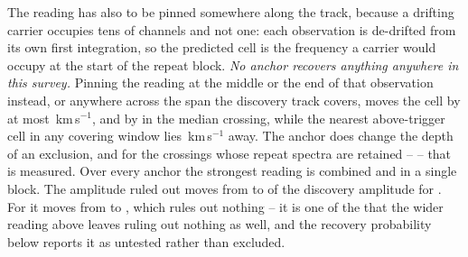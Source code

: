 The reading has also to be pinned somewhere along the track, because a
drifting carrier occupies tens of channels and not one: each observation is
de-drifted from its own first integration, so the predicted cell is the
frequency a carrier would occupy at the start of the repeat block. \emph{No anchor recovers anything anywhere in this survey.} Pinning the
reading at the middle or the end of that observation instead, or anywhere
across the span the discovery track covers, moves the cell by at most
\AnSpanMaxKms\,km\,s$^{-1}$, and by \AnSpanMedKms{} in the median crossing,
while the nearest above-trigger cell in any covering window lies
\AnNearKms\,km\,s$^{-1}$ away. The anchor does change the depth of an
exclusion, and for the \AnNMeas{} crossings whose repeat spectra are retained
-- \AnMeasStars{} -- that is measured. Over every anchor the strongest
reading is \AnTBest{} combined and \AnTSingle{} in a single block. The amplitude ruled out moves from \AnOtherFrom{} to \AnOtherTo{} of the
discovery amplitude for \AnOtherStar. For \AnWorstStar{} it moves from
\AnFracFrom{} to \AnFracTo, which rules out nothing -- it is one of the
\AnNWideVac{} that the wider reading above leaves ruling out nothing as well,
and the recovery probability below reports it as untested rather than
excluded.

